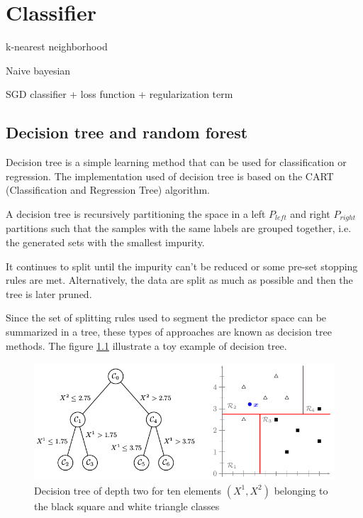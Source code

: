 \chapter{Classifier}

k-nearest neighborhood

Naive bayesian

SGD classifier + loss function + regularization term%

\section{Decision tree and random forest}

Decision tree is a simple learning method that can be used for classification or regression. The implementation used of decision tree is based on the CART (Classification and Regression Tree) algorithm.

A decision tree is recursively partitioning the space in a left $P_{left}$ and right $P_{right}$ partitions such that the samples with the same labels are grouped together, i.e. the generated sets with the smallest impurity.

It continues to split until the impurity can't be reduced or some pre-set stopping rules are met. Alternatively, the data are split as much as possible and then the tree is later pruned.

Since the set of splitting rules used to segment the predictor space can be summarized in a tree, these types of approaches are known as decision tree methods. The figure  \ref{fig:decision_tree_simple_example} illustrate a toy example of decision tree.

\begin{figure}[h]
    \includegraphics[scale=0.5]{img/decision_tree_simple_example}
    \caption[Decision tree of for ten elements belonging to two classes]{Decision tree of depth two for ten elements $(X^1, X^2)$ belonging to the black square and white triangle classes}
    \label{fig:decision_tree_simple_example}
\end{figure}

